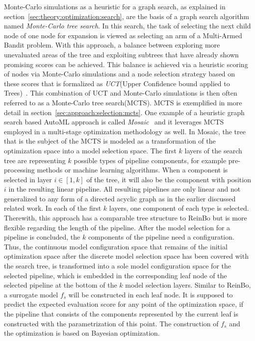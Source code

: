 Monte-Carlo simulations as a heuristic for a graph search, as explained in section~\ref{sec:theory:optimization:search}, are the basis of a graph search algorithm named \textit{Monte-Carlo tree search}.
In this search, the task of selecting the next child node of one node for expansion is viewed as selecting an arm of a Multi-Armed Bandit problem.
With this approach, a balance between exploring more unevaluated areas of the tree and exploiting subtrees that have already shown promising scores can be achieved.
This balance is achieved via a heuristic scoring of nodes via Monte-Carlo simulations and a node selection strategy based on these scores that is formalized as \textit{UCT}(Upper Confidence bound applied to Trees)~\cite{Kocsis-UCT}.
This combination of UCT and Monte-Carlo simulations is then often referred to as a Monte-Carlo tree search(MCTS).
MCTS is exemplified in more detail in section~\ref{sec:approach:selection:mcts}.\newline
One example of a heuristic graph search based AutoML approach is called \textit{Mosaic}~\cite{Rakotoarison-Mosaic} and it leverages MCTS employed in a multi-stage optimization methodology as well.
In Mosaic, the tree that is the subject of the MCTS is modeled as a transformation of the optimization space into a model selection space.
The first $k$ layers of the search tree are representing $k$ possible types of pipeline components, for example pre-processing methods or machine learning algorithms.
When a component is selected in layer $i \in [1,k]$ of the tree, it will also be the component with position $i$ in the resulting linear pipeline.
All resulting pipelines are only linear and not generalized to any form of a directed acyclic graph as in the earlier discussed related work.
In each of the first $k$ layers, one component of each type is selected.
Therewith, this approach has a comparable tree structure to ReinBo but is more flexible regarding the length of the pipeline.\newline
After the model selection for a pipeline is concluded, the $k$ components of the pipeline need a configuration.
Thus, the continuous model configuration space that remains of the initial optimization space after the discrete model selection space has been covered with the search tree, is transformed into a sole model configuration space for the selected pipeline, which is embedded in the corresponding leaf node of the selected pipeline at the bottom of the $k$ model selection layers.
Similar to ReinBo, a surrogate model $f_s$ will be constructed in each leaf node.
It is supposed to predict the expected evaluation score for any point of the optimization space, if the pipeline that consists of the components represented by the current leaf is constructed with the parametrization of this point.
The construction of $f_s$ and the optimization is based on Bayesian optimization.



